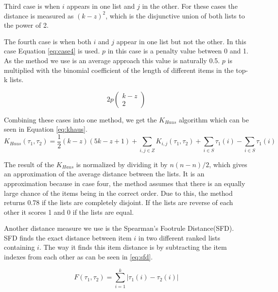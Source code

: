 Third case is when $i$ appears in one list and $j$ in the other. For these cases the distance is measured as $(k-z)^2$, which is the disjunctive union of both lists to the power of 2.

The fourth case is when both $i$ and $j$ appear in one list but not the other. In this case Equation \ref{eq:case4} is used. $p$ in this case is a penalty value between 0 and 1. As the method we use is an average approach this value is naturally 0.5. $p$ is multiplied with the binomial coefficient of the length of different items in the top-k lists.

\begin{equation}\label{eq:case4}
2p\left(\!
    \begin{array}{c}
      k-z \\
      2
    \end{array}
  \!\right)
\end{equation}


Combining these cases into one method, we get the $K_{Haus}$ algorithm which can be seen in Equation \ref{eq:khaus}. 
\footnotesize
\begin{equation}\label{eq:khaus}
K_{Haus}(\tau_1,\tau_2) = \frac{1}{2}(k-z)(5k-z+1)+ \sum_{i,j \in Z} K_{i,j}(\tau_1,\tau_2) + \sum_{i \in S}\tau_1(i) - \sum_{i \in S}\tau_1(i)
\end{equation}
\normalsize

The result of the $K_{Haus}$ is normalized by dividing it by $n(n-n)/2$, which gives an approximation of the average distance between the lists. It is an approximation because in case four, the method assumes that there is an equally large chance of the items being in the correct order. Due to this, the method returns 0.78 if the lists are completely disjoint. If the lists are reverse of each other it scores 1 and 0 if the lists are equal. %


Another distance measure we use is the Spearman's Footrule Distance(SFD). SFD finds the exact distance between item $i$ in two different ranked lists containing $i$. The way it finds this item distance is by subtracting the item indexes from each other as can be seen in \ref{eq:sfd}. 

\begin{equation}\label{eq:sfd}
F(\tau_1, \tau_2) = \sum_{i=1}^{k} | \tau_1 (i) - \tau_2 (i) |
\end{equation}

